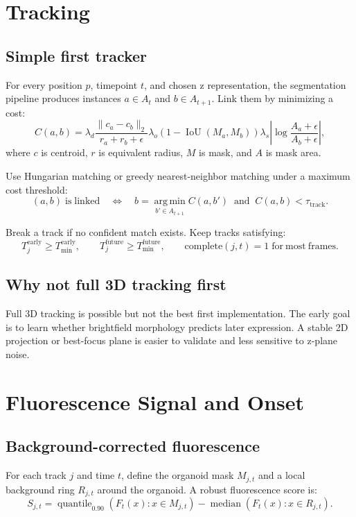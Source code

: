 \documentclass[11pt]{article}
\newcommand{\1}{\mathbf{1}}
\newcommand{\argmin}{\operatorname*{arg\,min}}
\newcommand{\median}{\operatorname{median}}
\newcommand{\IoU}{\operatorname{IoU}}
\begin{document}
\section{Tracking}
\subsection{Simple first tracker}
For every position \(p\), timepoint \(t\), and chosen z representation, the segmentation pipeline produces instances \(a\in A_t\) and \(b\in A_{t+1}\). Link them by minimizing a cost:
\begin{equation}
C(a,b) =
\lambda_d \frac{\lVert c_a-c_b\rVert_2}{r_a+r_b+\epsilon}
\lambda_o \left(1-\IoU(M_a,M_b)\right)
\lambda_s \left|\log\frac{A_a+\epsilon}{A_b+\epsilon}\right|,
\end{equation}
where \(c\) is centroid, \(r\) is equivalent radius, \(M\) is mask, and \(A\) is mask area.

Use Hungarian matching or greedy nearest-neighbor matching under a maximum cost threshold:
\begin{equation}
(a,b)\;\mathrm{is\;linked}\quad\Longleftrightarrow\quad
b=\argmin_{b'\in A_{t+1}} C(a,b') \;\;\mathrm{and}\;\; C(a,b)<\tau_{\mathrm{track}}.
\end{equation}

Break a track if no confident match exists. Keep tracks satisfying:
\begin{equation}
T_j^{\mathrm{early}}\ge T_{\min}^{\mathrm{early}},
\qquad
T_j^{\mathrm{future}}\ge T_{\min}^{\mathrm{future}},
\qquad
\mathrm{complete}(j,t)=1 \;\mathrm{for\ most\ frames}.
\end{equation}

\subsection{Why not full 3D tracking first}
Full 3D tracking is possible but not the best first implementation. The early goal is to learn whether brightfield morphology predicts later expression. A stable 2D projection or best-focus plane is easier to validate and less sensitive to z-plane noise.

\section{Fluorescence Signal and Onset}
\subsection{Background-corrected fluorescence}
For each track \(j\) and time \(t\), define the organoid mask \(M_{j,t}\) and a local background ring \(R_{j,t}\) around the organoid. A robust fluorescence score is:
\begin{equation}
S_{j,t} =
\operatorname{quantile}_{0.90}\left(F_t(x):x\in M_{j,t}\right)
-
\median\left(F_t(x):x\in R_{j,t}\right).
\end{equation}
\end{document}
